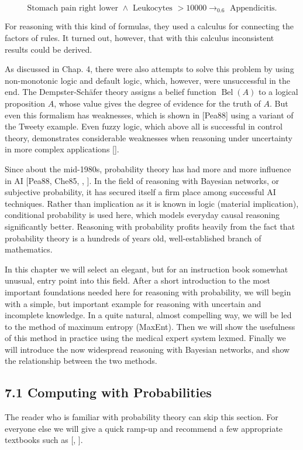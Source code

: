 \documentclass[10pt]{article}
\begin{document}
$$
\text { Stomach pain right lower } \wedge \text { Leukocytes }>10000 \rightarrow_{0.6} \text { Appendicitis. }
$$

For reasoning with this kind of formulas, they used a calculus for connecting the factors of rules. It turned out, however, that with this calculus inconsistent results could be derived.

As discussed in Chap. 4, there were also attempts to solve this problem by using non-monotonic logic and default logic, which, however, were unsuccessful in the end. The Dempster-Schäfer theory assigns a belief function $\operatorname{Bel}(A)$ to a logical proposition $A$, whose value gives the degree of evidence for the truth of $A$. But even this formalism has weaknesses, which is shown in [Pea88] using a variant of the Tweety example. Even fuzzy logic, which above all is successful in control theory, demonstrates considerable weaknesses when reasoning under uncertainty in more complex applications [\cite{elkan1993paradoxical}].


Since about the mid-1980s, probability theory has had more and more influence in AI [Pea88, Che85, \cite{whittaker1996graphical}, \cite{jensen2001bayesian}]. In the field of reasoning with Bayesian networks, or subjective probability, it has secured itself a firm place among successful AI techniques. Rather than implication as it is known in logic (material implication), conditional probability is used here, which models everyday causal reasoning significantly better. Reasoning with probability profits heavily from the fact that probability theory is a hundreds of years old, well-established branch of mathematics.

In this chapter we will select an elegant, but for an instruction book somewhat unusual, entry point into this field. After a short introduction to the most important foundations needed here for reasoning with probability, we will begin with a simple, but important example for reasoning with uncertain and incomplete knowledge. In a quite natural, almost compelling way, we will be led to the method of maximum entropy (MaxEnt). Then we will show the usefulness of this method in practice using the medical expert system lexmed. Finally we will introduce the now widespread reasoning with Bayesian networks, and show the relationship between the two methods.

\subsection*{7.1 Computing with Probabilities}
The reader who is familiar with probability theory can skip this section. For everyone else we will give a quick ramp-up and recommend a few appropriate textbooks such as [\cite{ross2009intro}, \cite{freedman2007statistics}].
\end{document}
